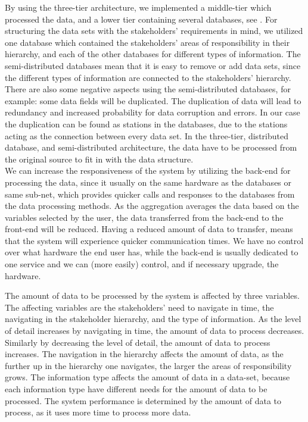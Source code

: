 By using the three-tier architecture, we implemented a middle-tier which 
processed the data, and a lower tier containing several databases, see . For
structuring the data sets with the stakeholders' requirements in mind, we
utilized one database which contained the stakeholders' areas of responsibility in
their hierarchy, and each of the other databases for different types of 
information. The semi-distributed databases mean that it is easy to remove or
add data sets, since the different types of information are connected to the
stakeholders' hierarchy. There are also some negative aspects using
the semi-distributed databases, for example: some data fields
will be duplicated. The duplication of data will lead to redundancy and
increased probability for data corruption and errors. In our case the duplication can be found as stations in the databases, due to the stations acting as the
connection between every data set. In the three-tier, distributed database, 
and semi-distributed architecture, the data have to be processed from the 
original source to fit in with the data structure.\\

We can increase the responsiveness of the system by utilizing the back-end for 
processing the data, since it usually on the same hardware as the databases or 
same sub-net, which provides quicker calls and responses to the databases from 
the data processing methods. As the aggregation averages the data based on the variables selected by the user, the data transferred from the back-end to the front-end will be reduced. Having a reduced amount of data to transfer, means that the system will experience quicker communication times. We 
have no control over what hardware the end user has, while the back-end 
is usually dedicated to one service and we can (more easily) control, and if 
necessary upgrade, the hardware.

The amount of data to be processed by the system is affected by three 
variables. The affecting variables are the stakeholders' need to navigate in 
time, the navigating in the stakeholder hierarchy, and the type of information.
As the level of detail increases by navigating in time, the amount of data to 
process decreases. Similarly by decreasing the level of detail, the amount of 
data to process increases. The navigation in the hierarchy affects the amount 
of data, as the further up in the hierarchy one navigates, the larger the 
areas of responsibility grows. The information type affects the amount of data 
in a data-set, because each information type have different needs for the 
amount of data to be processed. The system performance is determined by the 
amount of data to process, as it uses more time to process more data. 

